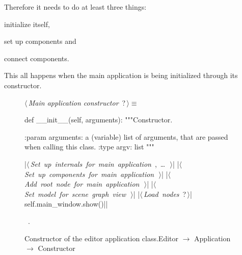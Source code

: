 \documentclass[%
    a4paper,    %
    justified,  %
    nobib,      %
    openany     %
]{tufte-book}
\begin{document}
Therefore it needs to do at least three things:
\begin{enumerate*}
  \item initialize itself,
  \item set up components and
  \item connect components.
  \end{enumerate*}
This all happens when the main application is being initialized through its
constructor.

\begin{figure}[h]
\begin{flushleft} \small
\begin{minipage}{\linewidth}\label{scrap13}\raggedright\small
{} $\langle\,${\itshape Main application constructor}\nobreak\ {\footnotesize {?}}$\,\rangle\equiv$
\vspace{-1ex}
\begin{pythoncode}
def __init__(self, arguments):
    """Constructor.

    :param arguments: a (variable) list of arguments, that are
                      passed when calling this class.
    :type  argv:      list
    """

    |\hbox{$\langle\,${\itshape Set up internals for main application}\nobreak\ {\footnotesize {}, \ldots\ }$\,\rangle$}|
    |\hbox{$\langle\,${\itshape Set up components for main application}\nobreak\ {\footnotesize {}}$\,\rangle$}|
    |\hbox{$\langle\,${\itshape Add root node for main application}\nobreak\ {\footnotesize {}}$\,\rangle$}|
    |\hbox{$\langle\,${\itshape Set model for scene graph view}\nobreak\ {\footnotesize {}}$\,\rangle$}|
    |\hbox{$\langle\,${\itshape Load nodes}\nobreak\ {\footnotesize ?}$\,\rangle$}|
    self.main_window.show()|\NWsep|
\end{pythoncode}
\vspace{1.5ex}
\footnotesize
\begin{list}{}{\setlength{\itemsep}{-\parsep}\setlength{\itemindent}{-\leftmargin}}
\item \NWtxtMacroRefIn\ .

\item{}
\end{list}
\end{minipage}\vspace{4ex}
\end{flushleft}
\caption{Constructor of the editor application
    class.\newline{}\newline{}Editor $\rightarrow$ Application $\rightarrow$
    Constructor} \label{editor:lst:app:constructor}
\end{figure}
\end{document}
